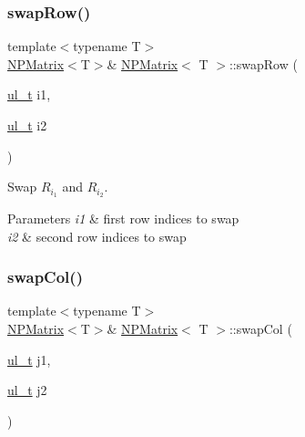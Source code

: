\subsubsection{\texorpdfstring{swapRow()}{swapRow()}}
{\footnotesize\ttfamily template$<$typename T$>$ \\
\mbox{\hyperlink{class_n_p_matrix}{N\+P\+Matrix}}$<$T$>$\& \mbox{\hyperlink{class_n_p_matrix}{N\+P\+Matrix}}$<$ T $>$\+::swap\+Row (\begin{DoxyParamCaption}\item[{\mbox{\hyperlink{typedef_8h_a1b140a2034db3f5dfe18a987745df43a}{ul\+\_\+t}}}]{i1,  }\item[{\mbox{\hyperlink{typedef_8h_a1b140a2034db3f5dfe18a987745df43a}{ul\+\_\+t}}}]{i2 }\end{DoxyParamCaption})\hspace{0.3cm}{\ttfamily [inline]}}



Swap $ R_{i_1} $ and $ R_{i_2} $. 


\begin{DoxyParams}{Parameters}
{\em i1} & first row indices to swap \\
\hline
{\em i2} & second row indices to swap \\
\hline
\end{DoxyParams}
\mbox{\label{class_n_p_matrix_a0df10f5717511bc15429955244b83ea1}} 
\subsubsection{\texorpdfstring{swapCol()}{swapCol()}}
{\footnotesize\ttfamily template$<$typename T$>$ \\
\mbox{\hyperlink{class_n_p_matrix}{N\+P\+Matrix}}$<$T$>$\& \mbox{\hyperlink{class_n_p_matrix}{N\+P\+Matrix}}$<$ T $>$\+::swap\+Col (\begin{DoxyParamCaption}\item[{\mbox{\hyperlink{typedef_8h_a1b140a2034db3f5dfe18a987745df43a}{ul\+\_\+t}}}]{j1,  }\item[{\mbox{\hyperlink{typedef_8h_a1b140a2034db3f5dfe18a987745df43a}{ul\+\_\+t}}}]{j2 }\end{DoxyParamCaption})\hspace{0.3cm}{\ttfamily [inline]}}



